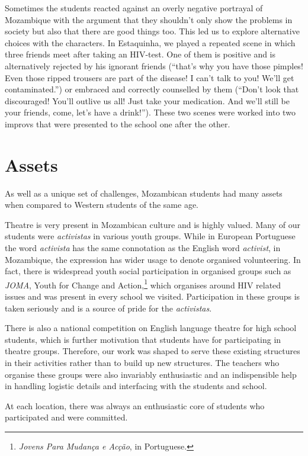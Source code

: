 \documentclass[article,twocolumn,twoside]{memoir}
\begin{document}
Sometimes the students reacted against an overly negative portrayal of
Mozambique with the argument that they shouldn't only show the problems in
society but also that there are good things too. This led us to explore
alternative choices with the characters. In Estaquinha, we played a repeated
scene in which three friends meet after taking an HIV-test. One of them is
positive and is alternatively rejected by his ignorant friends (``that's why
you have those pimples! Even those ripped trousers are part of the disease! I
can't talk to you! We'll get contaminated.'') or embraced and correctly
counselled by them (``Don't look that discouraged! You'll outlive us all! Just
take your medication. And we'll still be your friends, come, let's have a
drink!''). These two scenes were worked into two improvs that were presented to
the school one after the other.

\chapter{Assets}
As well as a unique set of challenges, Mozambican students had many assets when
compared to Western students of the same age.

Theatre is very present in Mozambican culture and is highly valued. Many of our
students were \textit{activistas} in various youth groups. While in European
Portuguese the word \textit{activista} has the same connotation as the English
word \textit{activist}, in Mozambique, the expression has wider usage to denote
organised volunteering. In fact, there is widespread youth social participation
in organised groups such as \textit{JOMA}, Youth for Change and
Action,\footnote{\textit{Jovens Para Mudança e Acção}, in Portuguese.} which
organises around HIV related issues and was present in every school we visited.
Participation in these groups is taken seriously and is a source of pride for
the \textit{activistas}.

There is also a national competition on English language theatre for high
school students, which is further motivation that students have for
participating in theatre groups. Therefore, our work was shaped to serve these
existing structures in their activities rather than to build up new structures.
The teachers who organise these groups were also invariably enthusiastic and an
indispensible help in handling logistic details and interfacing with the
students and school.

At each location, there was always an enthusiastic core of students who
participated and were committed.
\end{document}

